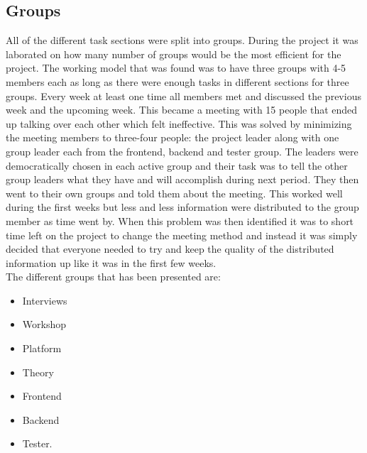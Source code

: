 \documentclass[a4paper,12pt]{article}
\begin{document}
\subsection{Groups} 
All of the different task sections were split into groups. During the project it was laborated on how many number of groups would be the most efficient for the project. The working model that was found was to have three groups with 4-5 members each as long as there were enough tasks in different sections for three groups. Every week at least one time all members met and discussed the previous week and the upcoming week. This became a meeting with 15 people that ended up talking over each other which felt ineffective. This was solved by minimizing the meeting members to three-four people: the project leader along with one group leader each from the frontend, backend and tester group. The leaders were democratically chosen in each active group and their task was to tell the other group leaders what they have and will accomplish during next period. They then went to their own groups and told them about the meeting. This worked well during the first weeks but less and less information were distributed to the group member as time went by. When this problem was then identified it was to short time left on the project to change the meeting method and instead it was simply decided that everyone needed to try and keep the quality of the distributed information up like it was in the first few weeks. \\
The different groups that has been presented are:\\
 \begin{itemize}
 \item Interviews
 \item Workshop
 \item Platform
 \item Theory
 \item Frontend
 \item Backend
 \item Tester.
 \end{itemize}
\end{document}
